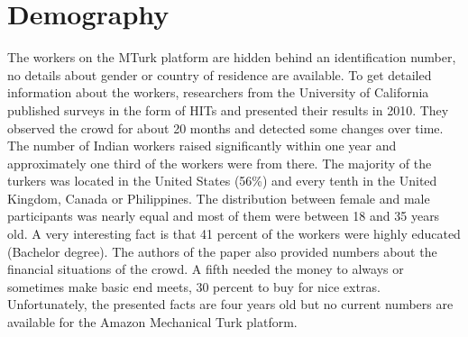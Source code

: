 \section{Demography}
The workers on the MTurk platform are hidden behind an identification number, no details about gender or country of residence are available. To get detailed information about the workers, researchers from the University of California published surveys in the form of HITs\cite{ross} and presented their results in 2010. They observed the crowd for about 20 months and detected some changes over time. The number of Indian workers raised significantly within one year and approximately one third of the workers were from there. The majority of the turkers was located in the United States (56\%) and every tenth in the United Kingdom, Canada or Philippines. The distribution between female and male participants was nearly equal and most of them were between 18 and 35 years old. A very interesting fact is that 41 percent of the workers were highly educated (Bachelor degree). The authors of the paper also provided numbers about the financial situations of the crowd. A fifth needed the money to always or sometimes make basic end meets, 30 percent to buy for nice extras. 
Unfortunately, the presented facts are four years old but no current numbers are available for the Amazon Mechanical Turk platform.

